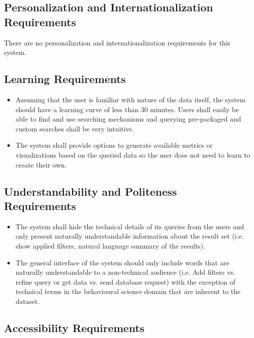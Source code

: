 \documentclass[12pt]{article}
\begin{document}
\subsection{Personalization and Internationalization Requirements}

\par{There are no personalization and internationalization requirements for this system.}



\subsection{Learning Requirements}

\begin{itemize}
    \item Assuming that the user is familiar with nature of the data itself, the system should
    have a learning curve of less than 30 minutes. Users shall easily be able to find and use searching
    mechanisms and querying pre-packaged and custom searches shall be very intuitive.
    \item The system shall provide options to generate available metrics or visualizations based on the queried
    data so the user does not need to learn to create their own.
\end{itemize}

\subsection{Understandability and Politeness Requirements}

\begin{itemize}
    \item The system shall hide the technical details of its queries from the users and only present naturally understandable information
    about the result set (i.e. show applied filters, natural language summary of the results).
    \item The general interface of the system should only include words that are naturally understandable to a non-technical audience (i.e. Add filters vs.
    refine query or get data vs. send database request) with the exception of technical terms in the behavioural science domain
    that are inherent to the dataset.
\end{itemize}

\subsection{Accessibility Requirements}
\end{document}
